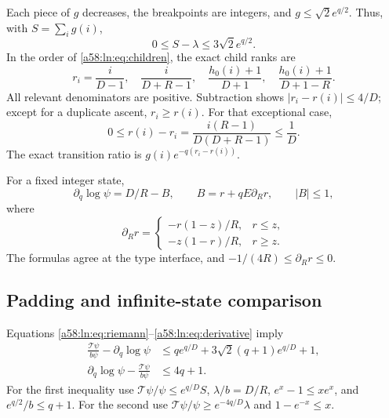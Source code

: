 \documentclass[11pt,letterpaper]{article}
\theoremstyle{remark}
\newcommand{\TT}{\mathcal T}
\begin{document}
Each piece of $g$ decreases, the breakpoints are integers, and
$g\le\sqrt2e^{q/2}$. Thus, with $S=\sum_i g(i)$,
\begin{equation}\label{a58:ln:eq:riemann}
 0\le S-\lambda\le3\sqrt2e^{q/2}.
\end{equation}
In the order of \eqref{a58:ln:eq:children}, the exact child ranks are
\begin{equation}\label{a58:ln:eq:childrank}
 r_i=\frac{i}{D-1},\quad \frac{i}{D+R-1},\quad
 \frac{h_0(i)+1}{D+1},\quad \frac{h_0(i)+1}{D+1-R}.
\end{equation}
All relevant denominators are positive. Subtraction shows
$|r_i-r(i)|\le4/D$; except for a duplicate ascent, $r_i\ge r(i)$.
For that exceptional case,
\begin{equation}\label{a58:ln:eq:negativechild}
 0\le r(i)-r_i=\frac{i(R-1)}{D(D+R-1)}\le\frac1D.
\end{equation}
The exact transition ratio is $g(i)e^{-q(r_i-r(i))}$.

For a fixed integer state,
\begin{equation}\label{a58:ln:eq:derivative}
 \partial_q\log\psi=D/R-B,\qquad B=r+qE\partial_R r,
 \qquad |B|\le1,
\end{equation}
where
\begin{equation}\label{a58:ln:eq:rR}
 \partial_R r=\begin{cases}-r(1-z)/R,&r\le z,\\
 -z(1-r)/R,&r\ge z.
 \end{cases}
\end{equation}
The formulas agree at the type interface, and
$-1/(4R)\le\partial_Rr\le0$.

\subsection{Padding and infinite-state comparison}\label{a58:ln:sec:comparison}
Equations \eqref{a58:ln:eq:riemann}--\eqref{a58:ln:eq:derivative} imply
\begin{align}
 \frac{\TT\psi}{b\psi}-\partial_q\log\psi
 &\le q e^{q/D}+3\sqrt2(q+1)e^{q/D}+1,\label{a58:ln:eq:coarseupper}\\
 \partial_q\log\psi-\frac{\TT\psi}{b\psi}&\le4q+1.
 \label{a58:ln:eq:coarselower}
\end{align}
For the first inequality use $\TT\psi/\psi\le e^{q/D}S$,
$\lambda/b=D/R$, $e^x-1\le xe^x$, and
$e^{q/2}/b\le q+1$. For the second use
$\TT\psi/\psi\ge e^{-4q/D}\lambda$ and $1-e^{-x}\le x$.
\end{document}
